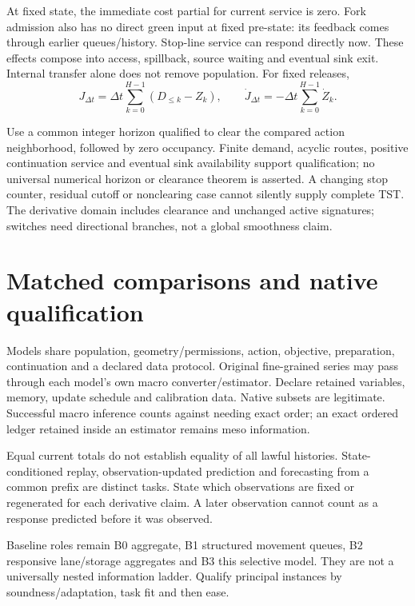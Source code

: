 \documentclass[10pt,a4paper]{article}
\begin{document}
At fixed state, the immediate cost partial for current service is zero.
Fork admission also has no direct green input at fixed pre-state: its
feedback comes through earlier queues/history. Stop-line service can
respond directly now. These effects compose into access, spillback,
source waiting and eventual sink exit. Internal transfer alone does not
remove population. For fixed releases,
\begin{equation}
 J_{\Delta t}=\Delta t\sum_{k=0}^{H-1}(D_{\leq k}-Z_k),
 \qquad
 \dot J_{\Delta t}=-\Delta t\sum_{k=0}^{H-1}\dot Z_k .
 \label{eq:exit-objective}
\end{equation}

Use a common integer horizon qualified to clear the compared action
neighborhood, followed by zero occupancy. Finite demand, acyclic routes,
positive continuation service and eventual sink availability support
qualification; no universal numerical horizon or clearance theorem is
asserted. A changing stop counter, residual cutoff or nonclearing case
cannot silently supply complete TST. The derivative domain includes
clearance and unchanged active signatures; switches need directional
branches, not a global smoothness claim.

\section{Matched comparisons and native qualification}

Models share population, geometry/permissions, action, objective,
preparation, continuation and a declared data protocol.
Original fine-grained series may pass through each model's own macro
converter/estimator. Declare retained variables, memory, update schedule
and calibration data. Native subsets are legitimate. Successful macro
inference counts against needing exact order; an exact ordered ledger
retained inside an estimator remains meso information.

Equal current totals do not establish equality of all lawful histories.
State-conditioned replay, observation-updated prediction and forecasting
from a common prefix are distinct tasks. State which observations are
fixed or regenerated for each derivative claim. A later observation
cannot count as a response predicted before it was observed.

Baseline roles remain B0 aggregate, B1 structured movement queues,
B2 responsive lane/storage aggregates and B3 this selective model.
They are not a universally nested information ladder.
Qualify principal instances by soundness/adaptation, task fit and then ease.
\end{document}
